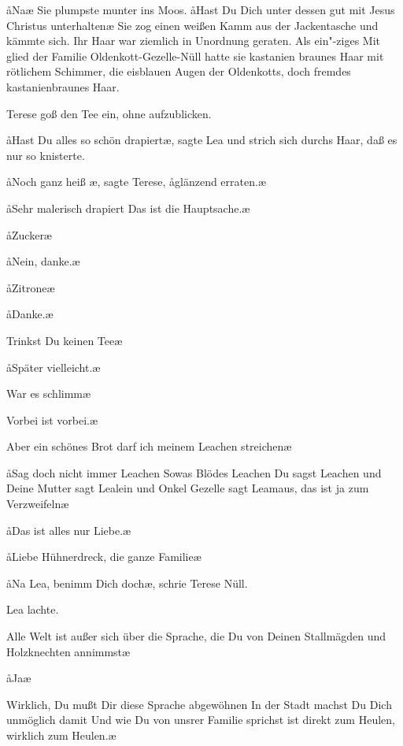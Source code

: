 \aa{}Na\frag{}\ae{} Sie plumpste munter ins Moos. \aa{}Hast Du Dich unter\-%
dessen gut mit Jesus Christus unterhalten\frag{}\ae{} Sie zog einen
weißen Kamm aus der Jackentasche und kämmte sich. Ihr
Haar war ziemlich in Unordnung geraten. Als ein"-ziges Mit\-%
glied der Familie Oldenkott-Gezelle-Nüll hatte sie kastanien\-%
braunes Haar mit rötlichem Schimmer, die eisblauen Augen
der Oldenkotts, doch fremdes kastanienbraunes Haar.

Terese goß den Tee ein, ohne aufzublicken.

\aa{}Hast Du alles so schön drapiert\frag{}\ae{}, sagte Lea und strich sich
durchs Haar, daß es nur so knisterte.

\aa{}Noch ganz heiß%
\eingriff{S26-1}{heiß\ae{}, ] heiß,\ae{}}\ae{},
sagte Terese, \aa{}glänzend erraten.\ae{}

\aa{}Sehr malerisch drapiert\ausr{} Das ist die Hauptsache.\ae{}

\aa{}Zucker\frag{}\ae{}

\aa{}Nein, danke.\ae{}

\aa{}Zitrone\frag{}\ae{}

\aa{}Danke.\ae{}

\aanah{}Trinkst Du keinen Tee\frag{}\ae{}

\aa{}Später vielleicht.\ae{}

\aanah{}War es schlimm\frag{}\ae{}

\aanah{}Vorbei ist vorbei.\ae{}

\aanah{}Aber ein schönes Brot darf ich meinem Leachen streichen\frag{}\ae{}

\aa{}Sag doch nicht immer Leachen\ausr{} Sowas Blödes\ausr{} Leachen\ausr{}
Du sagst Leachen und Deine Mutter sagt Lealein und Onkel
Gezelle sagt Leamaus, das ist ja zum Verzweifeln\ausr{}\ae{}

\aa{}Das ist alles nur Liebe.\ae{}

\aa{}Liebe\ausr{} Hühnerdreck, die ganze Familie\ausr{}\ae{}

\aa{}Na Lea, benimm Dich doch\ae{}, schrie Terese Nüll.

Lea lachte.

\aanah{}Alle Welt ist außer sich über die Sprache, die Du von Deinen
Stallmägden und Holzknechten annimmst\ausr{}\ae{}

\aa{}Ja\frag{}\ae{}

\aanah{}Wirklich, Du mußt Dir diese Sprache abgewöhnen\ausr{} In der
Stadt machst Du Dich unmöglich damit\ausr{} Und wie Du von
unsrer Familie sprichst ist direkt zum Heulen, wirklich zum
Heulen.\ae{}

